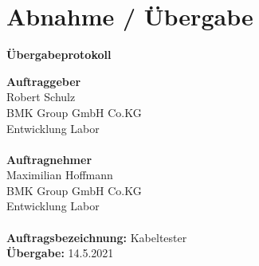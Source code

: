 \section{Abnahme / Übergabe}

\begin{center}
\begin{Huge}
\textbf{Übergabeprotokoll}
\end{Huge}
\end{center}

\textbf{Auftraggeber}\\
Robert Schulz\\
BMK Group GmbH Co.KG\\
Entwicklung Labor\\
\\
\textbf{Auftragnehmer}\\
Maximilian Hoffmann\\
BMK Group GmbH Co.KG\\
Entwicklung Labor\\
\\

\textbf{Auftragsbezeichnung:}
Kabeltester
\\
\textbf{Übergabe:}
14.5.2021
\\
